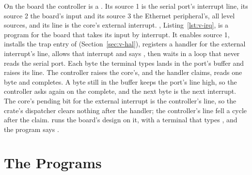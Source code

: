 \documentclass[journal,onecolumn,9pt]{IEEEtran}
\begin{document}
On the board the controller is a . Its source 1 is the
serial port's interrupt line, its source 2 the board's 
input and its source 3 the Ethernet peripheral's, all level sources, and its line is the core's external
interrupt. , Listing~\ref{lst:v-irq}, is a program for the
board that takes its input by interrupt. It enables source 1, installs
the trap entry of  (Section~\ref{sec:v-hal}),
registers a handler for the external interrupt's line, allows that
interrupt and says , then waits in a loop that never
reads the serial port. Each byte the terminal types lands in the
port's buffer and raises its line. The controller raises the core's,
and the handler claims, reads one byte and completes. A byte still in
the buffer keeps the port's line high, so the controller asks again on
the complete, and the next byte is the next interrupt. The core's
pending bit for the external interrupt is the controller's line, so
the crate's dispatcher clears nothing after the handler; the
controller's line fell a cycle after the claim.  runs the board's design on it,
with a terminal that types , and the program says
.



\section{The Programs}
\label{sec:v-programs}
\end{document}
